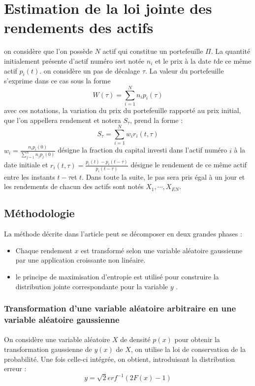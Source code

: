 \documentclass{article}
\begin{document}
\section{Estimation de la loi jointe des rendements des actifs}
on considère que l'on possède $ N $ actif qui constitue un portefeuille $ \Pi $. La quantité initialement présente d'actif numéro $ i $est notée $ n_{i} $ et le prix à la date $ t $de ce même actif $ p_{i}(t ) $.  on considère un pas de décalage $ \tau $. La valeur du portefeuille s'exprime dans ce cas sous la forme
\begin{equation}
W (\tau )=\sum_{i= 1}^{N}n_{i}p_{i} (\tau )
\end{equation}
avec ces notations, la variation du prix du portefeuille rapporté au prix initial, que l'on appellera rendement et notera $ S_{\tau} $, prend la forme :
\begin{equation}
S_{\tau}=\sum_{i= 1}^{N}w_{i}r_{i} (t,\tau )
\end{equation}
$ w_{i}=\frac{n_{i}p_{i}(0)}{\sum_{j=1}^{n}n_{j}p_{j}(0)} $ désigne la fraction du capital investi dans l'actif numéro $ i $ à la date initiale et $ r_{i}(t,\tau )=\frac{p_{i}(t)-p_{i}(t-\tau )}{p_{i}(t-\tau )} $ désigne le rendement de ce même actif entre les instants $ t-\tau $et $ t $.
Dans toute la suite, le pas sera pris égal à un jour et les rendements de chacun des actifs sont notés $ X_{ 1},\cdots , X_{EN} $.\subsection{Méthodologie}
 La méthode décrite dans l'article peut se décomposer en deux grandes phases :
 \begin{itemize}
 \item Chaque rendement $ x $ est transformé selon une variable aléatoire gaussienne par une application croissante non linéaire.
 \item  le principe de  maximisation d'entropie est utilisé pour construire la distribution jointe correspondante pour la variable $ y $ .
 \end{itemize}
 \subsubsection{Transformation d'une variable aléatoire arbitraire en une variable aléatoire gaussienne}
\paragraph{}
On considère une variable aléatoire $ X $ de densité $ p(x) $ pour obtenir  la transformation gaussienne de $ y(x) $ de $ X $, on utilise la loi de conservation de la probabilité. Une fois celle-ci intégrée, on obtient, introduisant la distribution erreur :
\begin{equation}
y=\sqrt{2}erf^{-1}(2F(x)-1)
\end{equation}
\end{document}
